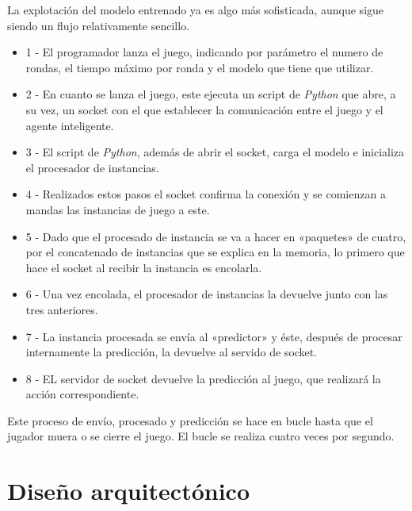 La explotación del modelo entrenado ya es algo más sofisticada, aunque sigue siendo un flujo relativamente sencillo.
\begin{itemize}
    \item 1 - El programador lanza el juego, indicando por parámetro el numero de rondas, el tiempo máximo por ronda y el modelo que tiene que utilizar.
    \item 2 - En cuanto se lanza el juego, este ejecuta un script de \emph{Python} que abre, a su vez, un socket con el que establecer la comunicación entre el juego y el agente inteligente.
    \item 3 - El script de \emph{Python}, además de abrir el socket, carga el modelo e inicializa el procesador de instancias.
    \item 4 - Realizados estos pasos el socket confirma la conexión y se comienzan a mandas las instancias de juego a este.
    \item 5 - Dado que el procesado de instancia se va a hacer en «paquetes» de cuatro, por el concatenado de instancias que se explica en la memoria, lo primero que hace el socket al recibir la instancia es encolarla.
    \item 6 - Una vez encolada, el procesador de instancias la devuelve junto con las tres anteriores.
    \item 7 - La instancia procesada se envía al «predictor» y éste, después de procesar internamente la predicción, la devuelve al servido de socket.
    \item 8 - EL servidor de socket devuelve la predicción al juego, que realizará la acción correspondiente.
\end{itemize}

Este proceso de envío, procesado y predicción se hace en bucle hasta que el jugador muera o se cierre el juego. El bucle se realiza cuatro veces por segundo.

\section{Diseño arquitectónico}